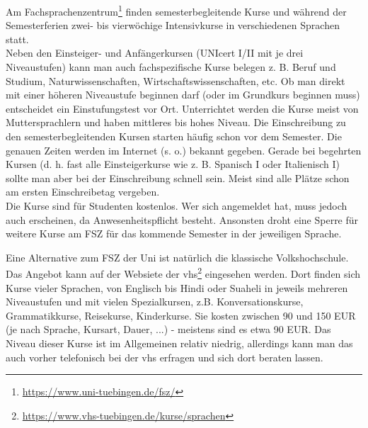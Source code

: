Am Fachsprachenzentrum\footnote{\url{https://www.uni-tuebingen.de/fsz/}} finden semesterbegleitende Kurse und während der Semesterferien zwei- bis vierwöchige Intensivkurse in verschiedenen Sprachen statt.\\	%
Neben den Einsteiger- und Anfängerkursen (UNIcert I/II mit je drei Niveaustufen) kann man auch fachspezifische Kurse belegen z. B. Beruf und Studium, Naturwissenschaften, Wirtschaftswissenschaften, etc.  Ob man direkt mit einer höheren Niveaustufe beginnen darf (oder im Grundkurs beginnen muss) entscheidet ein Einstufungstest vor Ort.  Unterrichtet werden die Kurse meist von Muttersprachlern und haben mittleres bis hohes Niveau.
Die Einschreibung zu den semesterbegleitenden Kursen starten häufig schon vor dem Semester. Die genauen Zeiten werden im Internet (s. o.) bekannt gegeben.  Gerade bei begehrten Kursen (d. h. fast alle Einsteigerkurse wie z. B. Spanisch I oder Italienisch I) sollte man aber bei der  Einschreibung schnell sein. Meist sind alle Plätze schon am ersten Einschreibetag vergeben.\\
Die Kurse sind für Studenten kostenlos. Wer sich angemeldet hat, muss jedoch auch erscheinen, da Anwesenheitspflicht besteht. Ansonsten droht eine Sperre für weitere Kurse am FSZ für das kommende Semester in der jeweiligen Sprache.
  
Eine Alternative zum FSZ der Uni ist natürlich die klassische Volkshochschule. Das Angebot kann auf der Websiete der vhs\footnote{\url{https://www.vhs-tuebingen.de/kurse/sprachen}} eingesehen werden. Dort finden sich Kurse vieler Sprachen, von Englisch bis Hindi oder Suaheli in jeweils mehreren Niveaustufen und mit vielen Spezialkursen, z.B. Konversationskurse, Grammatikkurse, Reisekurse, Kinderkurse. Sie kosten zwischen 90 und 150 EUR (je nach Sprache, Kursart, Dauer, ...) - meistens sind es etwa 90 EUR. Das Niveau dieser Kurse ist im Allgemeinen relativ niedrig, allerdings kann man das auch vorher telefonisch bei der vhs erfragen und sich dort beraten lassen.


\vfill
